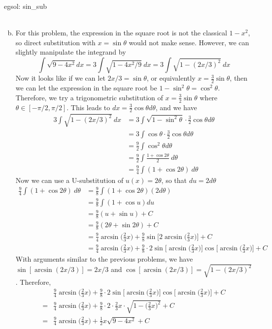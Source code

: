 \begin{egsol}[]{egsol: sin_sub}
\begin{enumerate}[a)]
\begin{align*}
        \end{align*}
        \item For this problem, the expression in the square root is not the classical $1-x^2$, so direct substitution with $x = \sin \theta$ would not make sense.  However, we can slightly manipulate the integrand by
        \[\int \sqrt{9-4x^2} dx = 3\int \sqrt{1-4x^2/9}~dx = 3\int \sqrt{1-(2x/3)^2}~dx\]
        Now it looks like if we can let $2x/3 = \sin \theta$, or equivalently $x = \frac{3}{2}\sin \theta$, then we can let the expression in the square root be $1-\sin^2\theta = \cos^2\theta$.  Therefore, we try a trigonometric substitution of $x = \frac{3}{2}\sin \theta$ where $\theta \in [-\pi/2, \pi/2]$.  This leads to $dx = \frac{3}{2}\cos \theta d\theta$, and we have 
        \begin{align*}
            3\int \sqrt{1-(2x/3)^2}~dx &= 3\int\sqrt{1-\sin^2\theta} \cdot \frac{3}{2}\cos \theta d\theta\\
            &= 3\int \cos\theta \cdot \frac{3}{2}\cos \theta d\theta\\
            &= \frac{9}{2}\int \cos^2\theta d\theta\\
            &= \frac{9}{2}\int \frac{1+\cos 2\theta}{2}~d\theta\\
            &= \frac{9}{4}\int (1+\cos 2\theta)~d\theta
        \end{align*}
        Now we can use a U-substitution of $u(x) = 2\theta$, so that $du = 2d\theta$
        \begin{align*}
            \frac{9}{4}\int (1+\cos 2\theta)~d\theta &= \frac{9}{8}\int (1+\cos 2\theta)(2d\theta)\\
            &= \frac{9}{8}\int (1+\cos u) du\\
            &= \frac{9}{8}(u + \sin u) + C\\
            &= \frac{9}{8}(2\theta + \sin 2\theta) + C\\
            &= \frac{9}{4}\arcsin \Big(\frac{2}{3}x\Big) + \frac{9}{8}\sin \Big[2\arcsin\Big(\frac{2}{3}x\Big)\Big] + C\\
            &= \frac{9}{4}\arcsin \Big(\frac{2}{3}x\Big) + \frac{9}{8} \cdot 2 \sin \Big[\arcsin\Big(\frac{2}{3}x\Big)\Big] \cos \Big[\arcsin\Big(\frac{2}{3}x\Big)\Big] + C
        \end{align*}
        With arguments similar to the previous problems, we have $\sin [\arcsin(2x/3)] = 2x/3$ and $\cos[\arcsin(2x/3)] = \sqrt{1-(2x/3)^2}$.  Therefore,
        \begin{align*}
            &\frac{9}{4}\arcsin \Big(\frac{2}{3}x\Big) + \frac{9}{8} \cdot 2 \sin \Big[\arcsin\Big(\frac{2}{3}x\Big)\Big] \cos \Big[\arcsin\Big(\frac{2}{3}x\Big)\Big] + C\\
            =&\frac{9}{4}\arcsin \Big(\frac{2}{3}x\Big) + \frac{9}{8} \cdot 2 \cdot \frac{2}{3} x \cdot\sqrt{1-\Big(\frac{2}{3}x\Big)^2} + C\\
            =&\frac{9}{4}\arcsin \Big(\frac{2}{3}x\Big) + \frac{1}{2}x\sqrt{9-4x^2} + C
        \end{align*}
    \end{enumerate}
\end{egsol}
